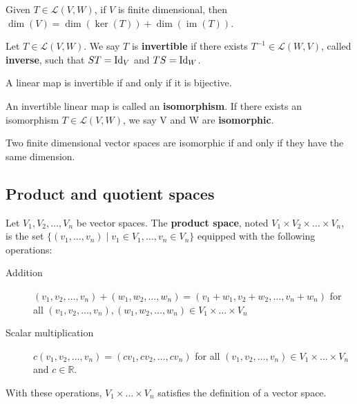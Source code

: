\documentclass{bareminimum}
\DeclareMathOperator{\im}{im}
\begin{document}
\begin{prop}
	Given $T \in \mathcal{L}(V,W)$, if $V$ is finite dimensional, then $\dim(V)  = \dim(\ker(T)) + \dim(\im(T))$.
\end{prop}

\begin{defn}[Inverse]
	Let  $T \in \mathcal{L}(V,W)$. We say $T$ is \textbf{invertible} if there exists $T^{-1} \in \mathcal{L}(W,V)$, called \textbf{inverse}, such that $ST = \operatorname{Id}_V$ and $TS = \operatorname{Id}_W$.
\end{defn}

\begin{prop}
	A linear map is invertible if and only if it is bijective.
\end{prop}

\begin{defn}
	An invertible linear map  is called an \textbf{isomorphism}. If there exists an isomorphism $T \in \mathcal{L}(V,W)$, we say V and W are \textbf{isomorphic}.
\end{defn}

\begin{prop}
	Two finite dimensional vector spaces are isomorphic if and only if they have the same dimension.
\end{prop}

	
	\subsection{Product and quotient spaces}
	
	
	\begin{defn}
		Let  $V_1,V_2,\ldots,V_n$ be vector spaces. The \textbf{product space}, noted $V_1 \times V_2 \times \ldots \times V_n$, is the set $\{ (v_1,\ldots,v_n) \mid v_1 \in V_1, \ldots, v_n \in V_n \}$ equipped with the following operations:
		\begin{description}
			\item[Addition] $(v_1, v_2, \ldots, v_n) + (w_1, w_2, \ldots, w_n) = (v_1+w_1, v_2+w_2, \ldots, v_n+w_n)$ for all $(v_1, v_2, \ldots, v_n), (w_1, w_2, \ldots, w_n) \in V_1 \times \ldots \times V_n$
			\item[Scalar multiplication] $c(v_1, v_2, \ldots, v_n) = (cv_1, cv_2, \ldots, cv_n)$ for all $(v_1, v_2, \ldots, v_n) \in V_1 \times \ldots \times V_n$ and $c \in \mathbb{R}$.
		\end{description}
		With these operations, $V_1 \times \ldots \times V_n$ satisfies the definition of a vector space.
	\end{defn}
	
\end{document}
